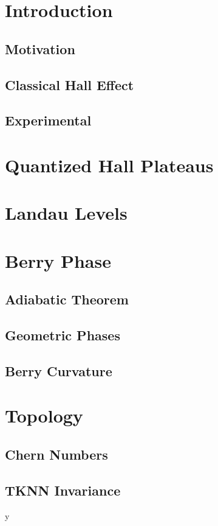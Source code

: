 \documentclass[11pt, twocolumn]{article}
\date{}
\begin{document}


\onecolumn
\tableofcontents
\newpage

\twocolumn


\section{Introduction}
\subsection{Motivation}
\subsection{Classical Hall Effect}
\subsection{Experimental}


\section{Quantized Hall Plateaus}

\section{Landau Levels}

\section{Berry Phase}

\subsection{Adiabatic Theorem}
\subsection{Geometric Phases}
\subsection{Berry Curvature}


\section{Topology}
\subsection{Chern Numbers}
\subsection{TKNN Invariance}

y
\end{document}

